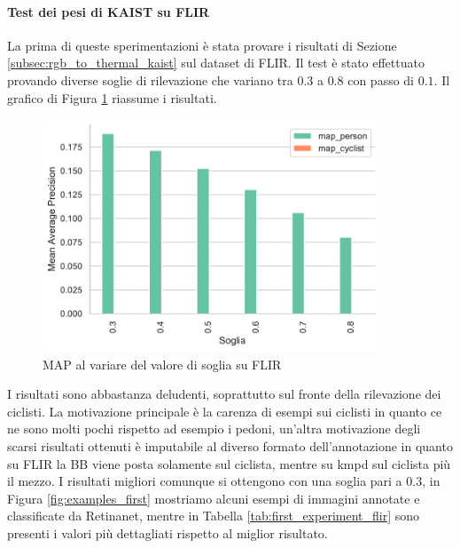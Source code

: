 \paragraph{Test dei pesi di KAIST su FLIR}
La prima di queste sperimentazioni è stata provare i risultati di Sezione \ref{subsec:rgb_to_thermal_kaist} sul dataset di FLIR. Il test è stato effettuato provando diverse soglie di rilevazione che variano tra $0.3$ a $0.8$ con passo di $0.1$. Il grafico di Figura \ref{fig:map_first_flir_lwir} riassume i risultati. 
\begin{figure}[]
    \centering
    \includegraphics[width = 0.9\textwidth]{images/graphic/first_test_lwir_map.pdf}
    \caption{MAP al variare del valore di soglia su FLIR}
    \label{fig:map_first_flir_lwir}
\end{figure}
I risultati sono abbastanza deludenti, soprattutto sul fronte della rilevazione dei ciclisti. La motivazione principale è la carenza di esempi sui ciclisti in quanto ce ne sono molti pochi rispetto ad esempio i pedoni, un'altra motivazione degli scarsi risultati ottenuti è imputabile al diverso formato dell'annotazione in quanto su FLIR la \ac{BB} viene posta solamente sul ciclista, mentre su \ac{kmpd} sul ciclista più il mezzo. I risultati migliori comunque si ottengono con una soglia pari a $0.3$, in Figura \ref{fig:examples_first} mostriamo alcuni esempi di immagini annotate e classificate da Retinanet, mentre in Tabella \ref{tab:first_experiment_flir} sono presenti i valori più dettagliati rispetto al miglior risultato. 
